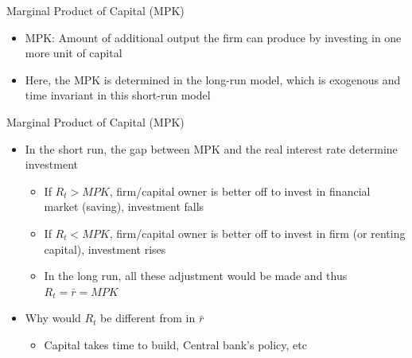 \documentclass[aspectratio=1610]{beamer}
\begin{document}
\begin{frame}[wide]{Marginal Product of Capital (MPK)}
	\begin{itemize}
		\item MPK: Amount of additional output the firm can produce by investing in one more unit of capital
		\vspace{4mm}
		\item Here, the MPK is determined in the long-run model, which is exogenous and time invariant in this short-run model 
		
	\end{itemize}
\end{frame}

\begin{frame}[wide]{Marginal Product of Capital (MPK)}
	\begin{itemize}
		\item In the short run, the gap between MPK and the real interest rate determine investment
		\vspace{1mm}
		\begin{itemize}
			\item If $R_t > MPK$, firm/capital owner is better off to invest in financial market (saving), investment falls
			\item If $R_t < MPK$, firm/capital owner is better off to invest in firm (or renting capital), investment rises
			\item In the long run, all these adjustment would be made and thus $R_t = \bar{r} = MPK$
		\end{itemize}
		\vspace{4mm}
		\item Why would $R_t$ be different from in $\bar{r}$
		\begin{itemize}
			\item Capital takes time to build, Central bank's policy, etc
		\end{itemize}
	\end{itemize}
\end{frame}
\end{document}
